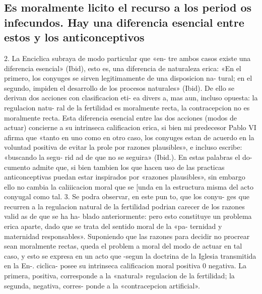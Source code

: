 \documentclass[letterpaper]{report}
\begin{document}
		\subsection{Es moralmente licito el recurso a los period os infecundos. 
		Hay una diferencia esencial entre estos y los anticonceptivos}
			2. La Enciclica subraya de modo particular que «en- 
			tre ambos casos existe una diferencia esencial» (Ibid), esto 
			es, una diferencia de naturaleza erica: «En el primero, los 
			conyuges se sirven legitimamente de una disposicion na- 
			tural; en el segundo, impiden el desarrollo de los procesos 
			naturales» (Ibid). 
			De ello se derivan dos acciones con clasificacion eti- 
			ea divers a, mas aun, incluso opuesta: la regulacion natu- 
			ral de la fertilidad es moralmente recta, la contracepcion 
			no es moralmente recta. Esta diferencia esencial entre las 
			dos acciones (modos de actuar) concierne a su intrinseca 
			calificacion erica, si bien mi predecesor Pablo VI afirma 
			que «tanto en uno como en otro caso, los conyuges estan 
			de acuerdo en la voluntad positiva de evitar la prole por 
			razones plausibles», e incluso escribe: «buscando la segu- 
			rid ad de que no se seguira» (Ibid.). En estas palabras el do- 
			cumento admite que, si bien tambien los que hacen uso 
			de las practicas anticonceptivas puedan estar inspirados 
			por «razones plausibles», sin embargo ello no cambia la 
			caliiicacion moral que se [unda en la estructura misma del 
			acto conyugal como tal. 
			3. Se podra observar, en este pun to, que los conyu- 
			ges que recurren a la regulacion natural de la fertilidad 
			podrian carecer de los razones valid as de que se ha ha-
			blado anteriormente: pero esto constituye un problema 
			erica aparte, dado que se trata del sentido moral de la «pa- 
			ternidad y maternidad responsables». 
			Suponiendo que las razones para decidir no procrear 
			sean moralmente rectas, queda el problem a moral del 
			modo de actuar en tal caso, y esto se expresa en un acto 
			que -segun la doctrina de la Iglesia transmitida en la En-. 
			ciclica- posee su intrinseca calificacion moral positiva 0 
			negativa. La primera, positiva, corresponde a la «natural» 
			regulacion de la fertilidad; la segunda, negativa, corres- 
			ponde a la «contracepcion artificial».
			
\end{document}

